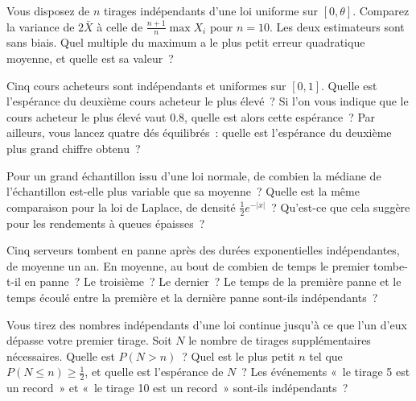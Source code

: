 \begin{question}\label{iq:iv1:order-statistics:5}
Vous disposez de $n$ tirages indépendants d'une loi uniforme sur $[0, \theta]$. Comparez la variance de $2\bar{X}$ à celle de $\frac{n + 1}{n}\max X_i$ pour $n = 10$. Les deux estimateurs sont sans biais. Quel multiple du maximum a le plus petit erreur quadratique moyenne, et quelle est sa valeur~?
\end{question}

\begin{question}\label{iq:iv1:order-statistics:6}
Cinq cours acheteurs sont indépendants et uniformes sur $[0, 1]$. Quelle est l'espérance du deuxième cours acheteur le plus élevé~? Si l'on vous indique que le cours acheteur le plus élevé vaut $0.8$, quelle est alors cette espérance~? Par ailleurs, vous lancez quatre dés équilibrés~: quelle est l'espérance du deuxième plus grand chiffre obtenu~?
\end{question}

\begin{question}\label{iq:iv1:order-statistics:7}
Pour un grand échantillon issu d'une loi normale, de combien la médiane de l'échantillon est-elle plus variable que sa moyenne~? Quelle est la même comparaison pour la loi de Laplace, de densité $\frac12 e^{-|x|}$~? Qu'est-ce que cela suggère pour les rendements à queues épaisses~?
\end{question}

\begin{question}\label{iq:iv1:order-statistics:8}
Cinq serveurs tombent en panne après des durées exponentielles indépendantes, de moyenne un an. En moyenne, au bout de combien de temps le premier tombe-t-il en panne~? Le troisième~? Le dernier~? Le temps de la première panne et le temps écoulé entre la première et la dernière panne sont-ils indépendants~?
\end{question}

\begin{question}\label{iq:iv1:order-statistics:9}
Vous tirez des nombres indépendants d'une loi continue jusqu'à ce que l'un d'eux dépasse votre premier tirage. Soit $N$ le nombre de tirages supplémentaires nécessaires. Quelle est $P(N > n)$~? Quel est le plus petit $n$ tel que $P(N \le n) \ge \frac12$, et quelle est l'espérance de $N$~? Les événements «~le tirage 5 est un record~» et «~le tirage 10 est un record~» sont-ils indépendants~?
\end{question}

